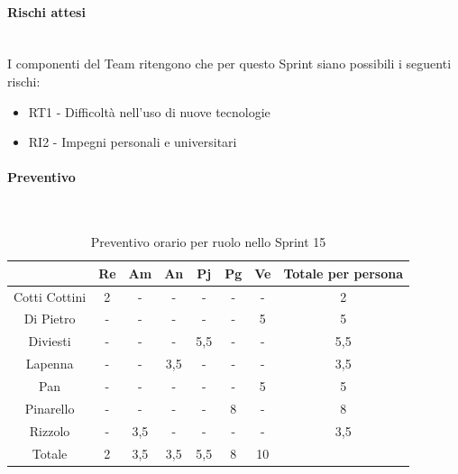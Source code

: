 \documentclass{article}
\begin{document}
                    \paragraph{Rischi attesi}\mbox{}\\
                    I componenti del Team ritengono che per questo Sprint siano possibili i seguenti rischi:
                    \begin{itemize}
                        \item RT1 - Difficoltà nell’uso di nuove tecnologie
                        \item RI2 - Impegni personali e universitari
                    \end{itemize}


                \paragraph{Preventivo}\mbox{}\\
                \begin{table}[H]
                    \centering
                    \begin{tabular}{|c|c|c|c|c|c|c|c|}
                    \hline
                                  & Re  & Am  & An  & Pj  & Pg  & Ve  & Totale per persona \\ \hline
                    Cotti Cottini & 2   & -   & -   & -   & -   & -   & 2                  \\ \hline
                    Di Pietro     & -   & -   & -   & -   & -   & 5   & 5                  \\ \hline
                    Diviesti      & -   & -   & -   & 5,5 & -   & -   & 5,5                \\ \hline
                    Lapenna       & -   & -   & 3,5 & -   & -   & -   & 3,5                \\ \hline
                    Pan           & -   & -   & -   & -   & -   & 5   & 5                  \\ \hline
                    Pinarello     & -   & -   & -   & -   & 8  & -   & 8                 \\ \hline
                    Rizzolo       & -   & 3,5 & -   & -   & -   & -   & 3,5                \\ \hline
                    Totale        & 2   & 3,5 & 3,5 & 5,5 & 8  & 10  &                    \\ \hline
                    \end{tabular}
                    \caption{Preventivo orario per ruolo nello Sprint 15}
                \end{table}
\end{document}
